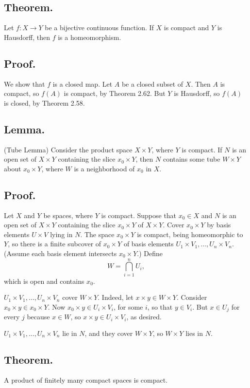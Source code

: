\documentclass[titlepage]{article}
\begin{document}
\subsection{Theorem.} Let $f: X \to Y$ be a bijective continuous function. If $X$ is compact and $Y$ is Hausdorff, then $f$ is a homeomorphism.

\subsection{Proof.} We show that $f$ is a closed map. Let $A$ be a closed subset of $X$. Then $A$ is compact, so $f(A)$ is compact, by Theorem 2.62. But $Y$ is Hausdorff, so $f(A)$ is closed, by Theorem 2.58.

\subsection{Lemma.} (Tube Lemma) Consider the product space $X \times Y$, where $Y$ is compact. If $N$ is an open set of $X \times Y$ containing the slice $x_{0} \times Y$, then $N$ contains some tube $W \times Y$ about $x_{0} \times Y$, where $W$ is a neighborhood of $x_{0}$ in $X$.

\subsection{Proof.} Let $X$ and $Y$ be spaces, where $Y$ is compact. Suppose that $x_{0} \in X$ and $N$ is an open set of $X \times Y$ containing the slice $x_{0} \times Y$ of $X \times Y$. Cover $x_{0} \times Y$ by basis elements $U \times V$ lying in $N$. The space $x_{0} \times Y$ is compact, being homeomorphic to $Y$, so there is a finite subcover of $x_{0} \times Y$ of basis elements $U_{1} \times V_{1}, \ldots, U_{n} \times V_{n}$. (Assume each basis element intersects $x_{0} \times Y$.) Define 
$$W = \bigcap_{i=1}^{n} U_{i},$$
which is open and contains $x_{0}$.

$U_{1} \times V_{1}, \ldots, U_{n} \times V_{n}$ cover $W \times Y$. Indeed, let $x \times y \in W \times Y$. Consider $x_{0} \times y \in x_{0} \times Y$. Now $x_{0} \times y \in U_{i} \times V_{i}$, for some $i$, so that $y \in V_{i}$. But $x \in U_{j}$ for every $j$ because $x \in W$, so $x \times y \in U_{i} \times V_{i}$, as desired.

$U_{1} \times V_{1}, \ldots, U_{n} \times V_{n}$ lie in $N$, and they cover $W \times Y$, so $W \times Y$ lies in $N$.

\subsection{Theorem.} A product of finitely many compact spaces is compact.
\end{document}
